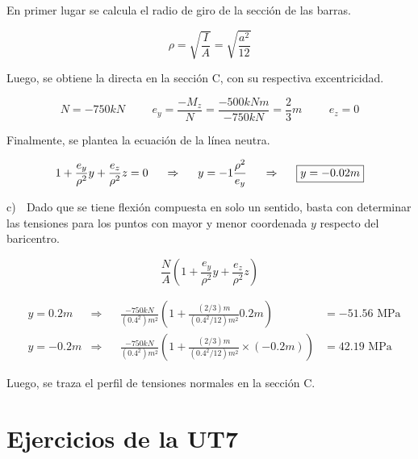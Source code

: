 En primer lugar se calcula el radio de giro de la sección de las barras. 

$$\rho = \sqrt{\frac{I}{A}} = \sqrt{\frac{a^2}{12}}$$

Luego, se obtiene la directa en la sección C, con su respectiva excentricidad. 

$$ N = -750kN \hspace{1cm} e_y = \frac{-M_z}{N} = \frac{-500kNm}{-750kN} = \frac{2}{3}m\hspace{1cm} e_z = 0$$

Finalmente, se plantea la ecuación de la línea neutra.

$$ 1+ \frac{e_y}{\rho^2} y + \frac{e_z}{\rho^2} z = 0 \hspace{0.5cm} \Rightarrow \hspace{0.5cm} y = -1 \frac{\rho^2}{e_y} \hspace{0.5cm} \Rightarrow \hspace{0.5cm} \boxed{y = -0.02m}$$

c) $\;$ Dado que se tiene flexión compuesta en solo un sentido, basta con determinar las tensiones para los puntos con mayor y menor coordenada $y$ respecto del baricentro.

$$ \frac{N}{A} \left ( 1 +  \frac{e_y}{\rho^2} y + \frac{e_z}{\rho^2} z  \right )$$

\begin{align*}
&	y = 0.2m  &\Rightarrow && \frac{-750kN}{(0.4^2)m^2} \left ( 1 + \frac{(2/3)m}{(0.4^2/12)m^2} 0.2m \right )& = -51.56 \text{ MPa}\\
&	y =-0.2m  &\Rightarrow && \frac{-750kN}{(0.4^2)m^2} \left ( 1 + \frac{(2/3)m}{(0.4^2/12)m^2} \times (-0.2m) \right )&= 42.19 \text{ MPa}
\end{align*}

Luego, se traza el perfil de tensiones normales en la sección C.


\begin{center}
	\def\svgwidth{0.5\textwidth}
	
\end{center}



\section{Ejercicios de la UT7} 

\subsection{}

